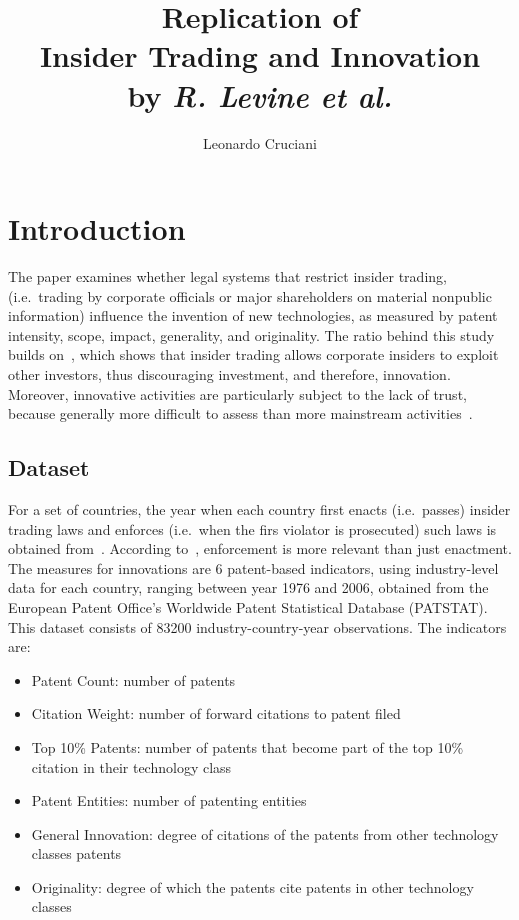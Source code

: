 \documentclass[12pt]{article}
\author{Leonardo Cruciani}
\title{Replication of \\ Insider Trading and Innovation \\ by \textit{R. Levine et al.}}
\begin{document}
    \maketitle
    \section{Introduction}
    \label{sec:introduction}
    The paper examines whether legal systems that restrict insider trading,
    (i.e.\ trading by corporate officials or major shareholders on material nonpublic information)
    influence the invention of new technologies, as measured by patent intensity, scope, impact, generality, and originality.
    The ratio behind this study builds on~\textcite{fishman}, which shows that insider trading allows corporate insiders to exploit other investors,
    thus discouraging investment, and therefore, innovation.
    Moreover, innovative activities are particularly subject to the lack of trust, because generally more difficult to assess than more mainstream activities~\parencite{holmstrom}.
    \subsection{Dataset}\label{subsec:dataset}
    For a set of countries, the year when each country first enacts (i.e.\ passes) insider trading laws and enforces (i.e.\ when the firs violator is prosecuted) such laws is obtained from~\textcite{bhattacharya}.
    According to~\textcite{bhattacharya}, enforcement is more relevant than just enactment.
    The measures for innovations are 6 patent-based indicators, using industry-level data for each country, ranging between year 1976 and 2006, obtained from the European Patent Office's Worldwide Patent Statistical Database (PATSTAT).
    This dataset consists of 83200 industry-country-year observations.
    The indicators are:
    \begin{itemize}
        \item Patent Count: number of patents 
        \item Citation Weight: number of forward citations to patent filed 
        \item Top 10\% Patents: number of patents that become part of the top 10\% citation in their technology class 
        \item Patent Entities: number of patenting entities 
        \item General Innovation: degree of citations of the patents from other technology classes patents 
        \item Originality: degree of which the patents cite patents in other technology classes 
    \end{itemize}
\end{document}
